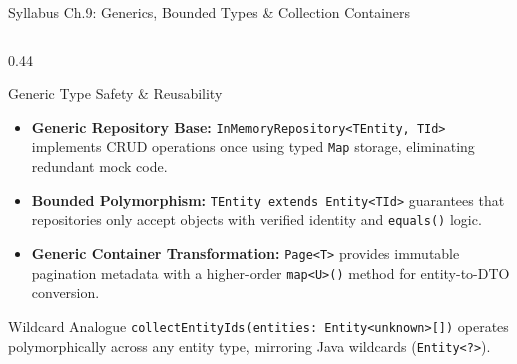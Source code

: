 ﻿\documentclass[aspectratio=169,10pt,t]{beamer}
\begin{document}
\begin{frame}[fragile]{Syllabus Ch.9: Generics, Bounded Types \& Collection Containers}
\begin{columns}[T,onlytextwidth]
    \begin{column}{0.44\textwidth}
      \begin{infoCard}{Generic Type Safety \& Reusability}
        \begin{itemize}\setlength{\itemsep}{1.2pt}\setlength{\parskip}{0pt}\setlength{\leftmargini}{7pt}
          \item \textbf{Generic Repository Base:} \texttt{InMemoryRepository<TEntity, TId>} implements CRUD operations once using typed \texttt{Map} storage, eliminating redundant mock code.
          \item \textbf{Bounded Polymorphism:} \lstinline|TEntity extends Entity<TId>| guarantees that repositories only accept objects with verified identity and \texttt{equals()} logic.
          \item \textbf{Generic Container Transformation:} \texttt{Page<T>} provides immutable pagination metadata with a higher-order \lstinline|map<U>()| method for entity-to-DTO conversion.
        \end{itemize}
      \end{infoCard}
      \vspace{1mm}
      \begin{hlCard}{Wildcard Analogue}
        \fontsize{5.4pt}{6.4pt}\selectfont
        \texttt{collectEntityIds(entities: Entity<unknown>[])} operates polymorphically across any entity type, mirroring Java wildcards (\texttt{Entity<?>}).
      \end{hlCard}
    \end{column}
  \end{columns}
\end{frame}
\end{document}

